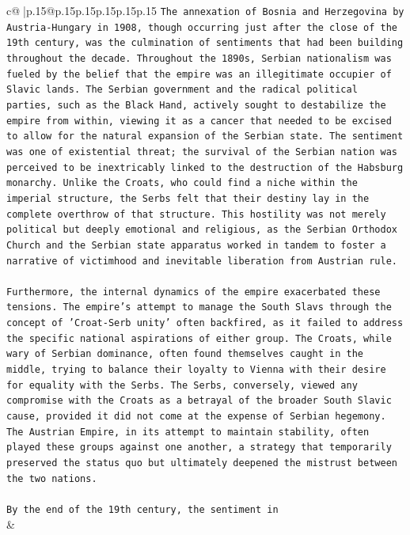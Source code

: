 \documentclass{article}
\begin{document}
{\begin{supertabular}{c@{$\;$}|p{.15\linewidth}@{}p{.15\linewidth}p{.15\linewidth}p{.15\linewidth}p{.15\linewidth}p{.15\linewidth}}
{{{\texttt{The annexation of Bosnia and Herzegovina by Austria{-}Hungary in 1908, though occurring just after the close of the 19th century, was the culmination of sentiments that had been building throughout the decade. Throughout the 1890s, Serbian nationalism was fueled by the belief that the empire was an illegitimate occupier of Slavic lands. The Serbian government and the radical political parties, such as the Black Hand, actively sought to destabilize the empire from within, viewing it as a cancer that needed to be excised to allow for the natural expansion of the Serbian state. The sentiment was one of existential threat; the survival of the Serbian nation was perceived to be inextricably linked to the destruction of the Habsburg monarchy. Unlike the Croats, who could find a niche within the imperial structure, the Serbs felt that their destiny lay in the complete overthrow of that structure. This hostility was not merely political but deeply emotional and religious, as the Serbian Orthodox Church and the Serbian state apparatus worked in tandem to foster a narrative of victimhood and inevitable liberation from Austrian rule.} \\
\\ 
\texttt{Furthermore, the internal dynamics of the empire exacerbated these tensions. The empire's attempt to manage the South Slavs through the concept of 'Croat{-}Serb unity' often backfired, as it failed to address the specific national aspirations of either group. The Croats, while wary of Serbian dominance, often found themselves caught in the middle, trying to balance their loyalty to Vienna with their desire for equality with the Serbs. The Serbs, conversely, viewed any compromise with the Croats as a betrayal of the broader South Slavic cause, provided it did not come at the expense of Serbian hegemony. The Austrian Empire, in its attempt to maintain stability, often played these groups against one another, a strategy that temporarily preserved the status quo but ultimately deepened the mistrust between the two nations.} \\
\\ 
\texttt{By the end of the 19th century, the sentiment in} \\
            }
        }
    }
    & \\ \\


\end{supertabular}}
\end{document}

